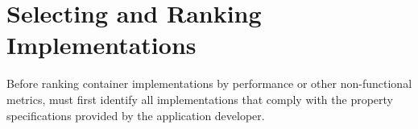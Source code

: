 


\section{Selecting and Ranking Implementations}
\label{chap2:select}
Before ranking container implementations by performance or other non-functional metrics, \Primrose{} must first identify all implementations that comply
with the property specifications provided by the application developer.

